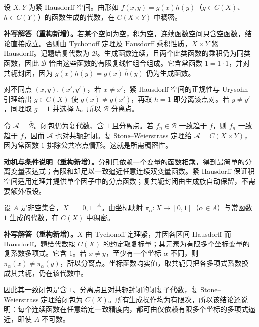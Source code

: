 \documentclass[../../main.tex]{subfiles}%
\begin{document}
\begin{exercise}\label{exercise:ch04-product-function-algebra}
设 $X,Y$ 为紧 Hausdorff 空间。由形如 $f(x,y)=g(x)h(y)$（$g\in C(X)$、$h\in C(Y)$）的函数生成的代数，在 $C(X\times Y)$ 中稠密。
\end{exercise}
\begin{solution}
\textbf{补写解答（重构新增）。}若某个空间为空，积为空，连续函数空间只含空函数，结论直接成立。否则由 Tychonoff 定理及 Hausdorff 乘积性质，$X\times Y$ 紧 Hausdorff。记题给复代数为 $\mathcal B$。生成函数连续，且两个此类函数的乘积仍为同类函数，因此 $\mathcal B$ 恰由这些函数的有限复线性组合组成。它含常函数 $1=1\cdot1$，并对共轭封闭，因为 $\overline{g(x)h(y)}=\overline g(x)\,\overline h(y)$ 仍为生成函数。

对不同点 $(x,y),(x',y')$，若 $x\ne x'$，紧 Hausdorff 空间的正规性与 Urysohn 引理给出 $g\in C(X)$ 使 $g(x)\ne g(x')$，再取 $h=1$ 即分离该点对。若 $y\ne y'$，同理取 $g=1$ 并选择 $h$。所以 $\mathcal B$ 分离点。

令 $\mathcal A=\overline{\mathcal B}$。闭包仍为复代数、含 $1$ 且分离点。若 $f_n\in\mathcal B$ 一致趋于 $f$，则 $\overline{f_n}$ 一致趋于 $\overline f$，因而 $\mathcal A$ 也对共轭封闭。复 Stone--Weierstrass 定理给 $\mathcal A=C(X\times Y)$，因为常函数 $1$ 排除公共零点情形。这就是所需稠密性。
\end{solution}
\begin{remark}
\textbf{动机与条件说明（重构新增）。}分别只依赖一个变量的函数相乘，得到最简单的分离变量表达式；有限和却足以一致逼近任意连续双变量函数。紧 Hausdorff 保证积空间适用定理并提供单个因子中的分点函数；复共轭封闭由生成族自动保留，不需要额外假设。
\end{remark}
\begin{exercise}\label{exercise:ch04-cube-coordinate-algebra}
设 $A$ 是非空集合，$X=[0,1]^A$。由坐标映射 $\pi_\alpha:X\to[0,1]$（$\alpha\in A$）与常函数 $1$ 生成的代数，在 $C(X)$ 中稠密。
\end{exercise}
\begin{solution}
\textbf{补写解答（重构新增）。}$X$ 由 Tychonoff 定理紧，并因各区间 Hausdorff 而 Hausdorff。题给代数按 $C(X)$ 的约定取复标量；其元素为有限多个坐标变量的复系数多项式。它含 $1$。若 $x\ne y$，至少有一个坐标 $\alpha$ 不同，则 $\pi_\alpha(x)\ne\pi_\alpha(y)$，所以分离点。坐标函数均实值，取共轭只把各多项式系数换成其共轭，仍在该代数中。

因此其一致闭包是含 $1$、分离点且对共轭封闭的闭复子代数，复 Stone--Weierstrass 定理给闭包为 $C(X)$。所有生成操作均为有限次，所以该结论还说明：每个连续函数在任意给定一致精度内，都可由仅依赖有限多个坐标的多项式逼近，即使 $A$ 不可数。
\end{solution}
\end{document}
